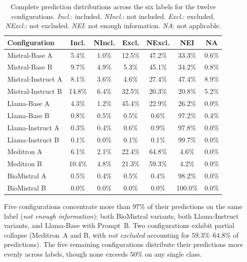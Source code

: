\begin{table}[htbp]
    \centering
    \caption{Complete prediction distributions across the six labels 
        for the twelve configurations. \emph{Incl.}: included. \emph{NIncl.}: 
        not included. \emph{Excl.}: excluded. \emph{NExcl.}: not excluded. 
        \emph{NEI}: not enough information. \emph{NA}: not applicable.}
    \label{tab:app-distributions}
    \small
    \begin{tabular}{@{}lcccccc@{}}
        \toprule
        \textbf{Configuration} & 
        \textbf{Incl.} & \textbf{NIncl.} & 
        \textbf{Excl.} & \textbf{NExcl.} & 
        \textbf{NEI} & \textbf{NA} \\
        \midrule
        Mistral-Base A     &  5.4\% &  1.0\% & 12.5\% & 47.2\% & 33.3\% &  0.6\% \\
        Mistral-Base B     &  9.7\% &  4.9\% &  5.3\% & 45.1\% & 34.2\% &  0.8\% \\
        Mistral-Instruct A &  8.1\% &  3.6\% &  4.6\% & 27.4\% & 47.4\% &  8.9\% \\
        Mistral-Instruct B & 14.8\% &  6.4\% & 32.5\% & 20.3\% & 20.8\% &  5.2\% \\
        Llama-Base A       &  4.3\% &  1.2\% & 45.4\% & 22.9\% & 26.2\% &  0.0\% \\
        Llama-Base B       &  0.8\% &  0.5\% &  0.5\% &  0.6\% & 97.2\% &  0.4\% \\
        Llama-Instruct A   &  0.3\% &  0.4\% &  0.6\% &  0.9\% & 97.8\% &  0.0\% \\
        Llama-Instruct B   &  0.1\% &  0.0\% &  0.1\% &  0.1\% & 99.7\% &  0.0\% \\
        Meditron A         &  6.1\% &  2.1\% & 22.4\% & 64.8\% &  4.6\% &  0.0\% \\
        Meditron B         & 10.4\% &  4.8\% & 21.3\% & 59.3\% &  4.2\% &  0.0\% \\
        BioMistral A       &  0.5\% &  0.4\% &  0.5\% &  0.4\% & 98.2\% &  0.0\% \\
        BioMistral B       &  0.0\% &  0.0\% &  0.0\% &  0.0\% & 100.0\% & 0.0\% \\
        \bottomrule
    \end{tabular}
\end{table}

Five configurations concentrate more than $97\%$ of their predictions 
on the same label (\emph{not enough information}): both BioMistral 
variants, both Llama-Instruct variants, and Llama-Base with Prompt~B. 
Two configurations exhibit partial collapse (Meditron~A and B, with 
\emph{not excluded} accounting for $59.3\%$--$64.8\%$ of predictions). 
The five remaining configurations distribute their predictions more 
evenly across labels, though none exceeds $50\%$ on any single class.

